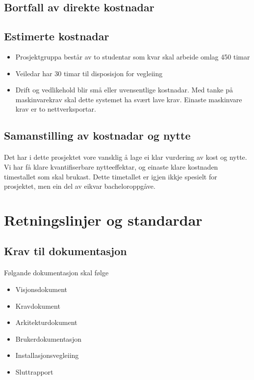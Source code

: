 \documentclass[nynorsk,12pt,a4paper]{article}
\begin{document}
\subsection{Bortfall av direkte kostnadar}

\subsection{Estimerte kostnadar}
\begin{itemize}
	\item Prosjektgruppa består av to studentar som kvar skal arbeide omlag 450 timar
	\item Veiledar har 30 timar til disposisjon for vegleiing
	\item Drift og vedlikehold blir små eller uvensentlige kostnadar. Med tanke på maskinvarekrav skal dette systemet ha svært lave krav. Einaste maskinvare krav er to nettverksportar. 
\end{itemize}

\subsection{Samanstilling av kostnadar og nytte}
\paragraph{}
Det har i dette prosjektet vore vansklig å lage ei klar vurdering av kost og nytte. Vi har få klare kvantifiserbare nytteeffektar, og einaste klare kostnaden timestallet som skal brukast. Dette timetallet er igjen ikkje spesielt for prosjektet, men ein del av eikvar bacheloroppgåve. 

\newpage
\section{Retningslinjer og standardar}
\subsection{Krav til dokumentasjon}
\paragraph{}
Følgande dokumentasjon skal følge
\begin{itemize}
	\item Visjonsdokument
	\item Kravdokument
	\item Arkitekturdokument
	\item Brukerdokumentasjon
	\item Installasjonsvegleiing
	\item Sluttrapport
\end{itemize}
\end{document}
